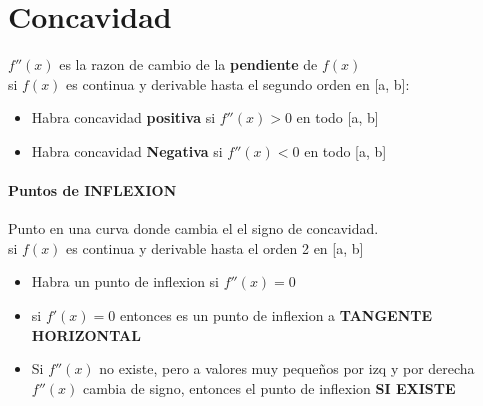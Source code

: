 \documentclass[11pt]{article}
\begin{document}
\section{Concavidad}
$f''(x)$ es la razon de cambio de la \textbf{pendiente} de $f(x)$\\
si $f(x)$ es continua y derivable hasta el segundo orden en [a, b]:
\begin{itemize}
	\item Habra concavidad \textbf{positiva} si $f''(x) > 0$ en todo [a, b]
	\item Habra concavidad \textbf{Negativa} si $f''(x) < 0$ en todo [a, b]
\end{itemize}
\paragraph{Puntos de INFLEXION} Punto en una curva donde cambia el el signo de concavidad.\\
si $f(x)$ es continua y derivable hasta el orden 2 en [a, b]
\begin{itemize}
	\item Habra un punto de inflexion si $f''(x) = 0$
	\item si $f'(x) = 0$ entonces es un  punto de inflexion a \textbf{TANGENTE HORIZONTAL}
	\item Si $f''(x)$ no existe, pero a valores muy pequeños por izq y por derecha $f''(x)$ cambia de signo, entonces el punto de inflexion \textbf{SI EXISTE}
\end{itemize}
\end{document}
